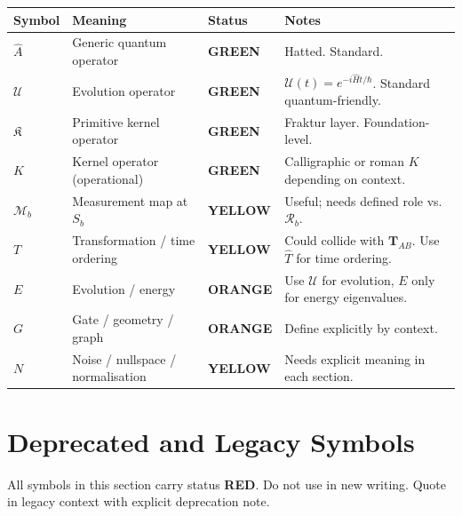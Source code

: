 \documentclass[11pt, a4paper, oneside]{article}
\newcommand{\GRN}{\colorbox{GreenBG}{\textcolor{GreenFG}{\small\bfseries GREEN}}}
\newcommand{\YEL}{\colorbox{YellowBG}{\textcolor{YellowFG}{\small\bfseries YELLOW}}}
\newcommand{\ORG}{\colorbox{OrangeBG}{\textcolor{OrangeFG}{\small\bfseries ORANGE}}}
\newcommand{\RED}{\colorbox{RedBG}{\textcolor{RedFG}{\small\bfseries RED}}}
\begin{document}
\begin{longtable}{C{1.8cm} L{4.5cm} C{1.5cm} L{5.2cm}}
  \toprule
  \textbf{Symbol} & \textbf{Meaning} & \textbf{Status} & \textbf{Notes} \\
  \midrule
  \endhead
  $\hat{A}$ & Generic quantum operator & \GRN & Hatted. Standard. \\[4pt]
  $\mathcal{U}$ & Evolution operator & \GRN &
    $\mathcal{U}(t) = e^{-i\hat{H}t/\hbar}$. Standard quantum-friendly. \\[4pt]
  $\mathfrak{K}$ & Primitive kernel operator & \GRN &
    Fraktur layer. Foundation-level. \\[4pt]
  $K$ & Kernel operator (operational) & \GRN &
    Calligraphic or roman $K$ depending on context. \\[4pt]
  $\mathcal{M}_b$ & Measurement map at $S_b$ & \YEL &
    Useful; needs defined role vs.\ $\mathcal{R}_b$. \\[4pt]
  $T$ & Transformation / time ordering & \YEL &
    Could collide with $\mathbf{T}_{AB}$. Use $\hat{T}$ for time ordering. \\[4pt]
  $E$ & Evolution / energy & \ORG &
    Use $\mathcal{U}$ for evolution, $E$ only for energy eigenvalues. \\[4pt]
  $G$ & Gate / geometry / graph & \ORG &
    Define explicitly by context. \\[4pt]
  $N$ & Noise / nullspace / normalisation & \YEL &
    Needs explicit meaning in each section. \\[4pt]
  \bottomrule
\end{longtable}

\section{Deprecated and Legacy Symbols}
\label{sec:deprecated}

\noindent
All symbols in this section carry status \RED.
Do not use in new writing.
Quote in legacy context with explicit deprecation note.
\end{document}
